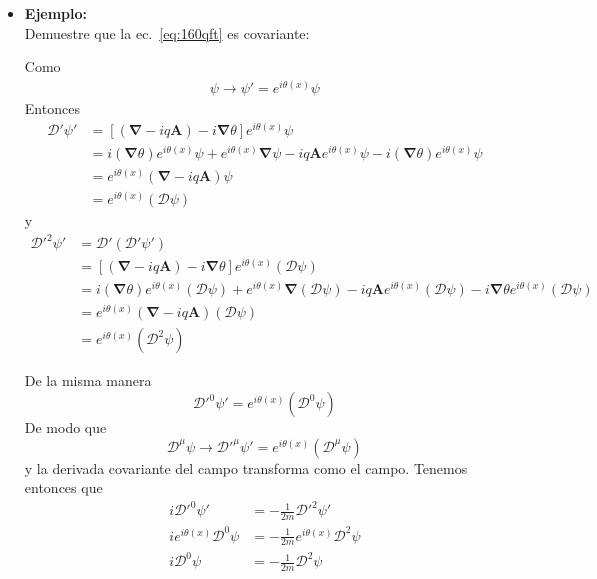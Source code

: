 \begin{subappendices}
\begin{itemize}
\item \textbf{Ejemplo:}\\ 
Demuestre que la ec.~\eqref{eq:160qft} es covariante:



Como 
\begin{align}
  \psi\to \psi'=e^{i\theta(x)}\psi
\end{align}
Entonces
\begin{align}
  \boldsymbol{\mathcal{D}}'\psi'&=\left[(\boldsymbol{\nabla}-iq\mathbf{A})-i\boldsymbol{\nabla}\theta\right]e^{i\theta(x)}\psi\nonumber\\
  &=i(\boldsymbol{\nabla}\theta)e^{i\theta(x)}\psi+e^{i\theta(x)}\boldsymbol{\nabla}\psi-iq\mathbf{A}e^{i\theta(x)}\psi-i(\boldsymbol{\nabla}\theta) e^{i\theta(x)}\psi\nonumber\\
  &=e^{i\theta(x)}(\boldsymbol{\nabla}-iq\mathbf{A})\psi\nonumber\\
  &=e^{i\theta(x)}(\boldsymbol{\mathcal{D}}\psi)
\end{align}
y
\begin{align}
  {\boldsymbol{\mathcal{D}}'}^2\psi'&=\boldsymbol{\mathcal{D}}'(\boldsymbol{\mathcal{D}}'\psi')\nonumber\\
  &=\left[(\boldsymbol{\nabla}-iq\mathbf{A})-i\boldsymbol{\nabla}\theta\right]e^{i\theta(x)}(\boldsymbol{\mathcal{D}}\psi)\nonumber\\
  &=i(\boldsymbol{\nabla}\theta)e^{i\theta(x)}(\boldsymbol{\mathcal{D}}\psi)+e^{i\theta(x)}\boldsymbol{\nabla}(\boldsymbol{\mathcal{D}}\psi)
  -iq\mathbf{A}e^{i\theta(x)}(\boldsymbol{\mathcal{D}}\psi)-i\boldsymbol{\nabla}\theta e^{i\theta(x)}(\boldsymbol{\mathcal{D}}\psi)\nonumber\\
  &=e^{i\theta(x)}(\boldsymbol{\nabla}-iq\mathbf{A})(\boldsymbol{\mathcal{D}}\psi)\nonumber\\
  &=e^{i\theta(x)}(\boldsymbol{\mathcal{D}}^2\psi)
\end{align}

De la misma manera
\begin{equation}
  {\mathcal{D}'}^0\psi'=e^{i\theta(x)}(\mathcal{D}^0\psi)
\end{equation}
De modo que
\begin{equation}
  \mathcal{D}^\mu\psi\to {\mathcal{D}'}^\mu\psi'=e^{i\theta(x)}(\mathcal{D}^\mu\psi)
\end{equation}
y la derivada covariante del campo transforma como el campo. Tenemos entonces que 
\begin{align}
  \label{eq:225qft}
     i{\mathcal{D}'}^0\psi'&=-\frac{1}{2m}{\boldsymbol{\mathcal{D}}'}^2\psi'\nonumber\\
     ie^{i\theta(x)}{\mathcal{D}}^0\psi&=-\frac{1}{2m}e^{i\theta(x)}{\boldsymbol{\mathcal{D}}}^2\psi\nonumber\\
     i{\mathcal{D}}^0\psi&=-\frac{1}{2m}{\boldsymbol{\mathcal{D}}}^2\psi
\end{align}
\end{itemize}


\end{subappendices}
